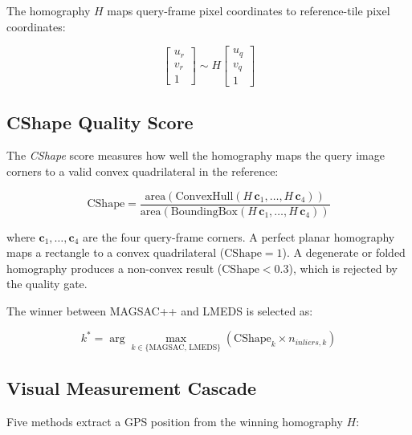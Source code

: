 \documentclass[12pt,a4paper]{article}
\begin{document}
The homography $H$ maps query-frame pixel coordinates to reference-tile pixel
coordinates:

\begin{equation}
    \begin{bmatrix}u_r \\ v_r \\ 1\end{bmatrix} \sim
    H \begin{bmatrix}u_q \\ v_q \\ 1\end{bmatrix}
    \label{eq:homography}
\end{equation}

\subsection{CShape Quality Score}

The \emph{CShape} score measures how well the homography maps the query image
corners to a valid convex quadrilateral in the reference:

\begin{equation}
    \text{CShape} =
    \frac{\text{area}\!\left(\text{ConvexHull}(H\,\mathbf{c}_1, \ldots, H\,\mathbf{c}_4)\right)}
    {\text{area}\!\left(\text{BoundingBox}(H\,\mathbf{c}_1, \ldots, H\,\mathbf{c}_4)\right)}
    \label{eq:cshape}
\end{equation}

where $\mathbf{c}_1,\ldots,\mathbf{c}_4$ are the four query-frame corners.
A perfect planar homography maps a rectangle to a convex quadrilateral
($\text{CShape} = 1$). A degenerate or folded homography produces a
non-convex result ($\text{CShape} < 0.3$), which is rejected by the quality
gate.

The winner between MAGSAC++ and LMEDS is selected as:

\begin{equation}
    k^* = \arg\max_{k \in \{\text{MAGSAC, LMEDS}\}}
    \left( \text{CShape}_k \times n_{inliers,k} \right)
\end{equation}

\subsection{Visual Measurement Cascade}

Five methods extract a GPS position from the winning homography $H$:
\end{document}
